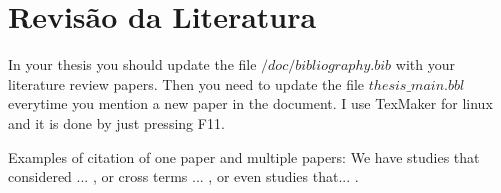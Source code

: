 \chapter{Revis\~ ao da Literatura} \label{chap:lit}


In your thesis you should update the file $/doc/bibliography.bib$ with your literature review papers.
Then you need to update the file $thesis\_main.bbl$ everytime you mention a new paper in the document.
I use TexMaker for linux and it is done by just pressing F11.

Examples of citation of one paper and multiple papers: We have studies that considered ... \cite{lim}, or cross terms ... \cite{luo}, or even studies that... \cite{liu,li2003,zhu2005}.
